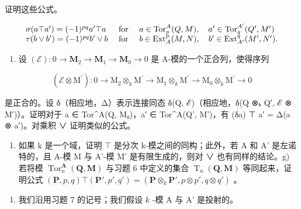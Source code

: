 证明这些公式。

\[
\begin{array}{l l} \sigma (a \top a ^ {\prime}) = (- 1) ^ {p q} a ^ {\prime} \top a & \text { for } \quad a \in \operatorname{Tor} _ {p} ^ {A} (Q, M), \quad a ^ {\prime} \in \operatorname{Tor} _ {q} ^ {A ^ {\prime}} (Q ^ {\prime}, M ^ {\prime}) \\ \tau (b \vee b ^ {\prime}) = (- 1) ^ {p q} b ^ {\prime} \vee b & \text { for } \quad b \in \operatorname{Ext} _ {A} ^ {p} (M, N), \quad b ^ {\prime} \in \operatorname{Ext} _ {A ^ {\prime}} ^ {q} (M ^ {\prime}, N ^ {\prime}). \end{array}
\]

\begin{enumerate}
\def\labelenumi{\alph{enumi})}
\setcounter{enumi}{4}
\tightlist
\item
  设 \((\mathcal{E}):0\to \mathbf{M}_2\to \mathbf{M}_1\to \mathbf{M}_0\to 0\) 是 A-模的一个正合列，使得序列
\end{enumerate}

\[
(\mathcal {E} \otimes \mathrm{M} ^ {\prime}): 0 \rightarrow \mathrm{M} _ {2} \otimes_ {k} \mathrm{M} ^ {\prime} \rightarrow \mathrm{M} _ {1} \otimes_ {k} \mathrm{M} ^ {\prime} \rightarrow \mathrm{M} _ {0} \otimes_ {k} \mathrm{M} ^ {\prime} \rightarrow 0
\]

是正合的。设 δ（相应地，Δ）表示连接同态 δ(Q, ℰ)（相应地，δ(Q ⊗ₖ Q′, ℰ ⊗ M′)）。证明对于 a ∈ Tor\^{}A(Q, M₀)，a′ ∈ Tor\^{}A(Q', M')，有 (δa) ⊤ a′ = Δ(a ⊗ a′)。对乘积 ∨ 证明类似的公式。

\begin{enumerate}
\def\labelenumi{\alph{enumi})}
\setcounter{enumi}{5}
\tightlist
\item
  如果 k 是一个域，证明 \(\top\) 是分次 k-模之间的同构；此外，若 A 和 A' 是左诺特的，且 A-模 M 与 A'-模 M' 是有限生成的，则对 ∨ 也有同样的结论。g) 若将模 \(\operatorname{Tor}_{n}^{\mathbf{A}}(\mathbf{Q},\mathbf{M})\) 与习题 6 中定义的集合 \(\operatorname{T}_{n}(\mathbf{Q},\mathbf{M})\) 等同起来，证明公式 \((\mathbf{P},p,q)\top(\mathbf{P}',p',q')=(\mathbf{P}\otimes_{k}\mathbf{P}',p\otimes p',q\otimes q')\) 。
\end{enumerate}

\begin{enumerate}
\def\labelenumi{\arabic{enumi})}
\setcounter{enumi}{7}
\tightlist
\item
  我们沿用习题 7 的记号；我们假设 \(k\) -模 A 与 A' 是投射的。
\end{enumerate}

